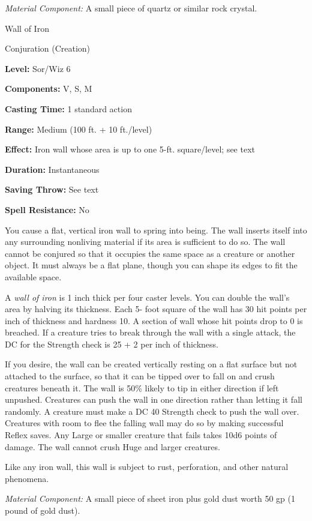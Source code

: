 \documentclass{article}
\begin{document}
\textit{Material Component: }A small piece of quartz or similar rock crystal.

\vspace{12pt}
Wall of Iron

Conjuration (Creation)

\textbf{Level:} Sor/Wiz 6

\textbf{Components:} V, S, M

\textbf{Casting Time:} 1 standard action

\textbf{Range: }Medium (100 ft. + 10 ft./level)

\textbf{Effect:} Iron wall whose area is up to one 5-ft. square/level; see text

\textbf{Duration:} Instantaneous

\textbf{Saving Throw:} See text

\textbf{Spell Resistance:} No

You cause a flat, vertical iron wall to spring into being. The wall inserts itself 
into any surrounding nonliving material if its area is sufficient to do so. The 
wall cannot be conjured so that it occupies the same space as a creature or another 
object. It must always be a flat plane, though you can shape its edges to fit the 
available space.

A \textit{wall of iron }is 1 inch thick per four caster levels. You can double 
the wall's area by halving its thickness. Each 5- foot square of the wall has 30 
hit points per inch of thickness and hardness 10. A section of wall whose hit points 
drop to 0 is breached. If a creature tries to break through the wall with a single 
attack, the DC for the Strength check is 25 + 2 per inch of thickness.

If you desire, the wall can be created vertically resting on a flat surface but 
not attached to the surface, so that it can be tipped over to fall on and crush 
creatures beneath it. The wall is 50\% likely to tip in either direction if left 
unpushed. Creatures can push the wall in one direction rather than letting it fall 
randomly. A creature must make a DC 40 Strength check to push the wall over. Creatures 
with room to flee the falling wall may do so by making successful Reflex saves. 
Any Large or smaller creature that fails takes 10d6 points of damage. The wall 
cannot crush Huge and larger creatures.

Like any iron wall, this wall is subject to rust, perforation, and other natural 
phenomena.

\textit{Material Component: }A small piece of sheet iron plus gold dust worth 50 
gp (1 pound of gold dust).
\end{document}
